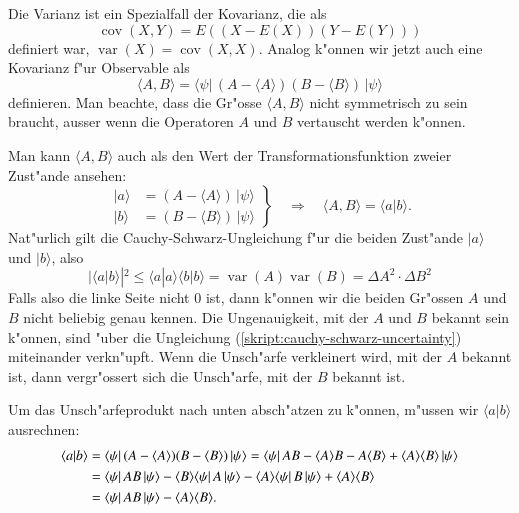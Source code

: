 Die Varianz ist ein Spezialfall der Kovarianz, die als 
\[
\operatorname{cov}(X,Y)
=
E((X-E(X))(Y-E(Y)))
\]
definiert war, $\operatorname{var}(X)=\operatorname{cov}(X,X)$.
Analog k"onnen wir jetzt auch eine Kovarianz f"ur Observable als
\[
\langle A,B\rangle
=
\langle\psi|
\,
(A-\langle A\rangle)(B-\langle B\rangle)
\,
|\psi\rangle
\]
definieren.
Man beachte, dass die Gr"osse $\langle A,B\rangle$ nicht symmetrisch zu
sein braucht, ausser wenn die Operatoren $A$ und $B$ vertauscht werden
k"onnen.

Man kann $\langle A,B\rangle$ auch als den Wert der Transformationsfunktion 
zweier Zust"ande ansehen:
\begin{equation}
\left.
\begin{aligned}
|a\rangle &= (A-\langle A\rangle)\,|\psi\rangle\\
|b\rangle &= (B-\langle B\rangle)\,|\psi\rangle
\end{aligned}
\right\}
\quad
\Rightarrow
\quad
\langle A,B\rangle = \langle a|b\rangle.
\end{equation}
Nat"urlich gilt die Cauchy-Schwarz-Ungleichung f"ur die beiden
Zust"ande $|a\rangle$ und $|b\rangle$, also
\begin{equation}
|\langle a|b\rangle|^2
\le
\langle a|a\rangle \langle b|b\rangle
=
\operatorname{var}(A)\operatorname{var}(B)
=\Delta A^2 \cdot \Delta B^2
\label{cauchy-schwarz-uncertainty}
\end{equation}
Falls also die linke Seite nicht $0$ ist, dann k"onnen wir die beiden
Gr"ossen $A$ und $B$ nicht beliebig genau kennen.
Die Ungenauigkeit, mit der $A$ und $B$ bekannt sein k"onnen, sind "uber
die Ungleichung (\ref{skript:cauchy-schwarz-uncertainty}) miteinander verkn"upft.
Wenn die Unsch"arfe verkleinert wird, mit der $A$ bekannt ist, dann 
vergr"ossert sich die Unsch"arfe, mit der $B$ bekannt ist.

Um das Unsch"arfeprodukt nach unten absch"atzen zu k"onnen, m"ussen
wir $\langle a|b\rangle$ ausrechnen:
\begin{align}
\langle a|b\rangle
&=
\langle\psi|\,
(A-\langle A\rangle)(B-\langle B\rangle)
\,|\psi\rangle
=
\langle\psi|\,
AB-\langle A\rangle B-A\langle B\rangle
+
\langle A\rangle\langle B\rangle
\,|\psi\rangle
\notag
\\
&=
\langle\psi|\,AB\,|\psi\rangle
-\langle B\rangle\langle\psi|\,A\,|\psi\rangle
-\langle A\rangle\langle\psi|\,B\,|\psi\rangle
+
\langle A\rangle\langle B\rangle
\notag
\\
&=
\langle\psi|\,AB\,|\psi\rangle
-
\langle A\rangle\langle B\rangle.
\label{skript:abausrechnung}
\end{align}


